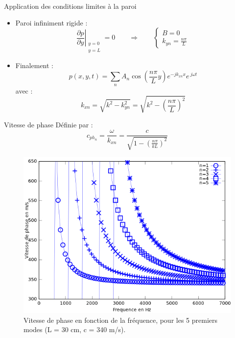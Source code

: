\documentclass[xcolor=x11names,compress]{beamer}
\renewcommand{\(}{\begin{columns}}
\renewcommand{\)}{\end{columns}}
\newcommand{\<}[1]{\begin{column}{#1}}
\renewcommand{\>}{\end{column}}
\begin{document}
\begin{frame}{Application des conditions limites à la paroi}
	\begin{itemize}
		\item Paroi infiniment rigide : 
		\begin{equation*}
			\left.\frac{\partial{p}}{\partial{y}}\right|_{\begin{smallmatrix}y=0 \\ y=L\end{smallmatrix}} = 0 \qquad \Rightarrow \qquad \begin{cases} B = 0 \\ k_{yn} = \frac{n\pi}{L} \end{cases}
		\end{equation*}		
		\item Finalement :
		\begin{equation}
				p(x,y,t) = \sum_n A_n \cos\left(\frac{n\pi}{L}y\right)e^{-jk_{xn}x}e^{~j\omega t}
			\end{equation}
		\bigskip
		avec : 
		\begin{equation}
			k_{xn} =\sqrt{k^2-k_{yn}^2}= \sqrt{k^2-\left(\frac{n\pi}{L}\right)^2}
		\end{equation}
	\end{itemize} 

\end{frame}

\begin{frame}{Vitesse de phase}
	Définie par : 
	\begin{equation}
		c_{ph_n} = \frac{\omega}{k_{xn}} = \frac{c}{\sqrt{1-\left(\frac{n\pi}{kL}\right)^2}}
	\end{equation}
	\bigskip
	\begin{figure}
		\includegraphics[scale=0.35]{./figures/c_phase.jpg}
		\caption*{\scriptsize Vitesse de phase en fonction de la fréquence, pour les 5 premiers modes (L = 30 cm, c = 340 m/s).}
	\end{figure}
\end{frame}
\end{document}
